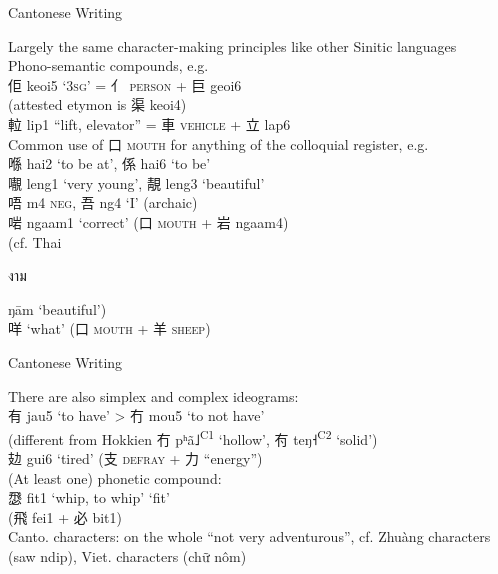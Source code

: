 \documentclass{beamer}
\begin{document}
\begin{frame}[fragile]{Cantonese Writing}

Largely the same character-making principles like other Sinitic languages\\

Phono-semantic compounds, e.g.\\
佢 keoi5 \enquote*{\textsc{3sg}} = 亻 \textsc{person} + 巨 geoi6\\ \quad (attested etymon is 渠 keoi4)\\
𨋢 lip1 \enquote{lift, elevator} = 車 \textsc{vehicle} + 立 lap6\\ 

\bigskip
Common use of 口 \textsc{mouth} for anything of the colloquial register, e.g.\\
喺 hai2 \enquote*{to be at}, 係 hai6 \enquote*{to be}\\
𡃁 leng1 \enquote*{very young}, 靚 leng3 \enquote*{beautiful} \\
唔 m4 \textsc{neg}, 吾 ng4 \enquote*{I} (archaic)\\
啱 ngaam1 \enquote*{correct} (口 \textsc{mouth} + 岩 ngaam4)\\ \quad (cf. Thai \begin{thai}งาม\end{thai} ŋām \enquote*{beautiful})\\
咩 \enquote*{what} (口 \textsc{mouth} + 羊 \textsc{sheep})
\end{frame}

\begin{frame}[fragile]{Cantonese Writing}

There are also simplex and complex ideograms:\\
有 jau5 \enquote*{to have} > 冇 mou5 \enquote*{to not have}\\
\quad (different from Hokkien 冇 pʰã˩\textsuperscript{C1} \enquote*{hollow}, 𠕇 teŋ˧\textsuperscript{C2} \enquote*{solid})\\
攰 gui6 \enquote*{tired} (支 \textsc{defray} + 力 \enquote{energy})\\

\bigskip
(At least one) phonetic compound:\\
𢞵 fit1 \enquote*{whip, to whip} \enquote*{fit}\\
\quad (飛 fei1 + 必 bit1)\\

Canto. characters: on the whole \enquote{not very adventurous}, cf. Zhuàng characters (saw ndip), Viet. characters (chữ nôm)\\

\end{frame}
\end{document}
